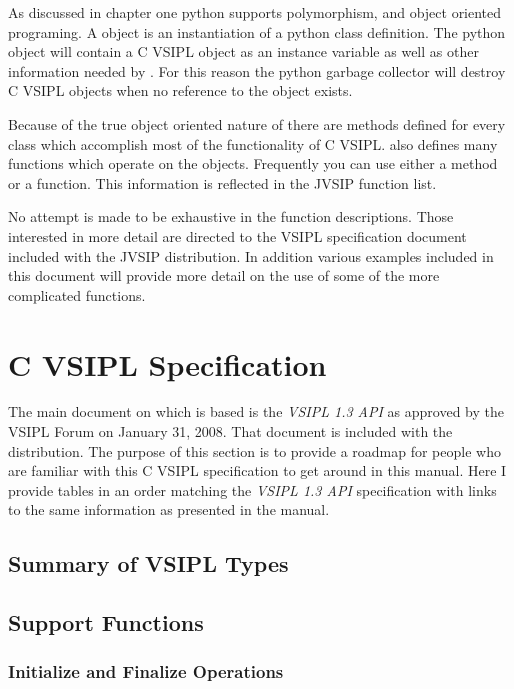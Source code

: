 As discussed in chapter one python supports polymorphism, and object oriented programing. A \pyjv object is an instantiation of a python class definition. The python object will contain a C VSIPL object as an instance variable as well as other information needed by \pyjv. For this reason the python garbage collector will destroy C VSIPL objects when no reference to the \pyjv object exists.

Because of the true object oriented nature of \pyjv there are methods defined for every class which accomplish most of the functionality of C VSIPL.  also defines many functions which operate on the \pyjv objects. Frequently you can use either a method or a function. This information is reflected in the JVSIP function list.

No attempt is made to be exhaustive in the function descriptions. Those interested in more detail are directed to the VSIPL specification document included with the JVSIP distribution. In addition various examples included in this document will provide more detail on the use of some of the more complicated functions.

\section*{C VSIPL Specification}
The main document on which  is based is the \emph{VSIPL 1.3 API} as approved by the VSIPL Forum on January 31, 2008.  That document is included with the  distribution.  The purpose of this section is to provide a roadmap for people who are familiar with this C VSIPL specification to get around in this  manual.  Here I provide tables in an order matching the \emph{VSIPL 1.3 API} specification with links to the same information as presented  in the  manual.
\subsection*{Summary of VSIPL Types}
\subsection*{Support Functions}
    
\subsubsection*{Initialize and Finalize Operations}

